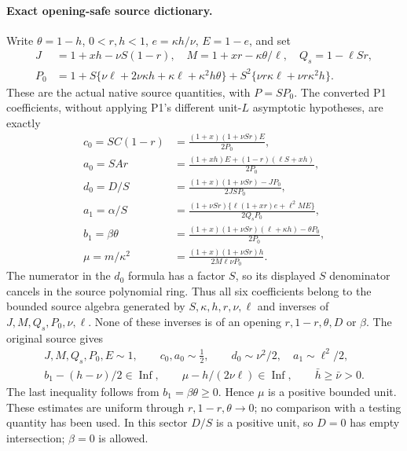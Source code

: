 \paragraph{Exact opening-safe source dictionary.}
Write $\theta=1-h$, $0<r,h<1$, $e=\kappa h/\nu$, $E=1-e$,
and set
\[
\begin{split}
 J&=1+xh-\nu S(1-r),\quad
 M=1+xr-\kappa\theta/\ell,\quad Q_s=1-\ell Sr,\\
 P_0&=1+S\{\nu\ell+2\nu\kappa h+\kappa\ell+
                    \kappa^2h\theta\}
             +S^2\{\nu r\kappa\ell+\nu r\kappa^2h\}.
\end{split}\tag{FM2}
\]
These are the actual native source quantities, with $P=SP_0$.
The converted P1 coefficients, without applying P1's different
unit-$L$ asymptotic hypotheses, are exactly
\[
\begin{split}
 c_0=SC(1-r)&=\frac{(1+x)(1+\nu Sr)E}{2P_0},\\
 a_0=SAr&=\frac{(1+xh)E+(1-r)(\ell S+xh)}{2P_0},\\
 d_0=D/S&=\frac{(1+x)(1+\nu Sr)-JP_0}{2JSP_0},\\
 a_1=\alpha/S&=
 \frac{(1+\nu Sr)\{\ell(1+xr)e+\ell^2ME\}}{2Q_sP_0},\\
 b_1=\beta\theta&=
 \frac{(1+x)(1+\nu Sr)(\ell+\kappa h)-\theta P_0}{2P_0},\\
 \mu=m/\kappa^2&=
 \frac{(1+x)(1+\nu Sr)h}{2M\ell\nu P_0}.
\end{split}\tag{FM3}
\]
The numerator in the $d_0$ formula has a factor $S$, so its displayed
$S$ denominator cancels in the source polynomial ring. Thus all six
coefficients belong to the bounded source algebra generated by
$S,\kappa,h,r,\nu,\ell$ and inverses of $J,M,Q_s,P_0,\nu,\ell$.
None of these inverses is of an opening $r,1-r,\theta,D$ or $\beta$.
The original source gives
\[
\begin{gathered}
 J,M,Q_s,P_0,E\sim1,\qquad c_0,a_0\sim\tfrac12,\qquad
 d_0\sim\nu^2/2,\quad a_1\sim\ell^2/2,\\
 b_1-(h-\nu)/2\in\operatorname{Inf},\qquad
 \mu-h/(2\nu\ell)\in\operatorname{Inf},\qquad
 \bar h\ge\bar\nu>0.
\end{gathered}\tag{FM4}
\]
The last inequality follows from $b_1=\beta\theta\ge0$.
Hence $\mu$ is a positive bounded unit. These estimates are uniform
through $r,1-r,\theta\to0$; no comparison with a testing quantity
has been used. In this sector $D/S$ is a positive unit, so $D=0$
has empty intersection; $\beta=0$ is allowed.

